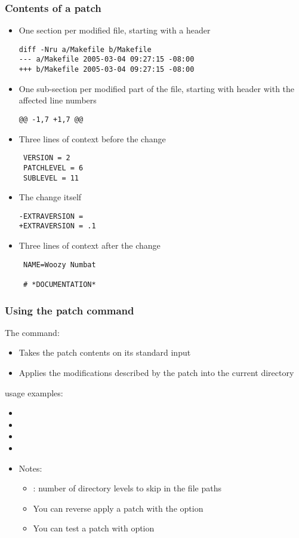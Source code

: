 \begin{frame}[fragile]
  \frametitle{Contents of a patch}
  \begin{itemize}
  \item One section per modified file, starting with a header
\scriptsize
\begin{verbatim}
diff -Nru a/Makefile b/Makefile
--- a/Makefile 2005-03-04 09:27:15 -08:00
+++ b/Makefile 2005-03-04 09:27:15 -08:00
\end{verbatim}
\normalsize
  \item One sub-section per modified part of the file, starting with
    header with the affected line numbers
\scriptsize
\begin{verbatim}
@@ -1,7 +1,7 @@
\end{verbatim}
\normalsize
  \item Three lines of context before the change
\scriptsize
\begin{verbatim}
 VERSION = 2
 PATCHLEVEL = 6
 SUBLEVEL = 11
\end{verbatim}
\normalsize
  \item The change itself
\scriptsize
\begin{verbatim}
-EXTRAVERSION =
+EXTRAVERSION = .1
\end{verbatim}
\normalsize
    \item Three lines of context after the change
\scriptsize
\begin{verbatim}
 NAME=Woozy Numbat

 # *DOCUMENTATION*
\end{verbatim}
\normalsize
    \end{itemize}
\end{frame}

\begin{frame}
  \frametitle{Using the patch command}
  The  command:
  \begin{itemize}
  \item Takes the patch contents on its standard input
  \item Applies the modifications described by the patch into the
    current directory
  \end{itemize}
   usage examples:
  \begin{itemize}
  \item {}
  \item {}
  \item {}
  \item {}
  \item Notes:
    \begin{itemize}
    \item {}: number of directory levels to skip in the file paths
    \item You can reverse apply a patch with the  option
    \item You can test a patch with  option
    \end{itemize}
  \end{itemize}
\end{frame}

